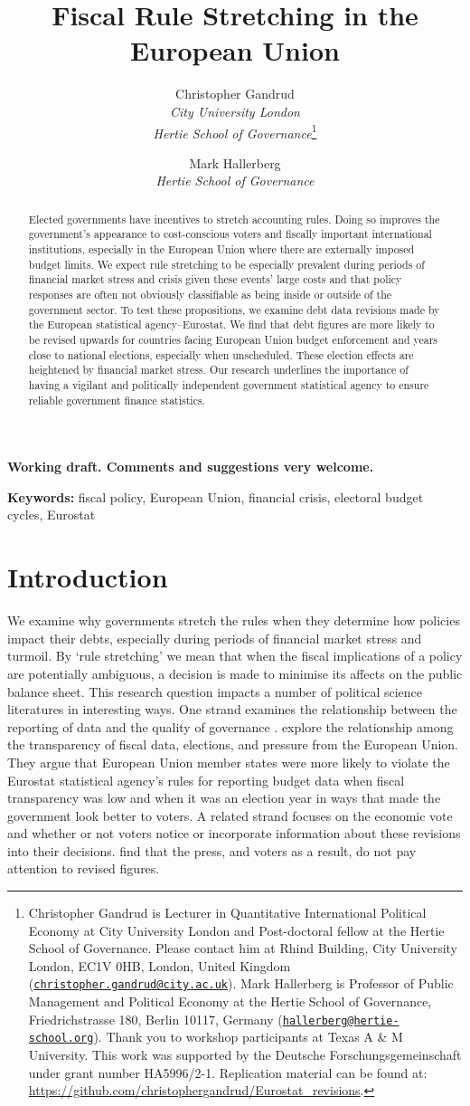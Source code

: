 \documentclass[]{article}
\title{Fiscal Rule Stretching in the European Union}
\author{Christopher Gandrud \\ \emph{City University London} \\ \emph{Hertie School of Governance}\footnote{Christopher Gandrud is Lecturer in Quantitative International Political Economy at City University London and Post-doctoral fellow at the Hertie School of Governance. Please contact him at Rhind Building, City University London, EC1V 0HB, London, United Kingdom
(\href{mailto:christopher.gandrud@city.ac.uk}{\nolinkurl{christopher.gandrud@city.ac.uk}}). Mark Hallerberg is Professor of Public Management and Political Economy at the Hertie School of Governance, Friedrichstrasse 180, Berlin 10117, Germany (\href{mailto:hallerberg@hertie-school.org}{\nolinkurl{hallerberg@hertie-school.org}}). Thank you to workshop participants at Texas A \& M University. This work was supported by the Deutsche Forschungsgemeinschaft under grant number HA5996/2-1. Replication material can be found at: \url{https://github.com/christophergandrud/Eurostat_revisions}.}
\and
Mark Hallerberg \\ \emph{Hertie School of Governance}}
\begin{document}
\maketitle


\begin{center}
    \textbf{Working draft. Comments and suggestions very welcome.}
\end{center}

\begin{abstract}
Elected governments have incentives to stretch accounting rules. Doing so improves the government’s appearance to cost-conscious voters and fiscally important international institutions, especially in the European Union where there are externally imposed budget limits. We expect rule stretching to be especially prevalent during periods of financial market stress and crisis given these events' large costs and that policy responses are often not obviously classifiable as being inside or outside of the government sector. To test these propositions, we examine debt data revisions made by the European statistical agency--Eurostat. We find that debt figures are more likely to be revised upwards for countries facing European Union budget enforcement and years close to national elections, especially when unscheduled. These election effects are heightened by financial market stress. Our research underlines the importance of having a vigilant and politically independent government statistical agency to ensure reliable government finance statistics.
\end{abstract}


\textbf{Keywords:} fiscal policy, European Union, financial crisis, electoral budget cycles, Eurostat


\section{Introduction}

We examine why governments stretch the rules when they determine how policies impact their debts, especially during periods of financial market stress and turmoil. By `rule stretching' we mean that when the fiscal implications of a policy are potentially ambiguous, a decision is made to minimise its affects on the public balance sheet. This research question impacts a number of political science literatures in interesting ways. One strand examines the relationship between the reporting of data and the quality of governance \cite[e.g.][]{Hollyer2014}. \cite{Alt2014} explore the relationship among the transparency of fiscal data, elections, and pressure from the European Union. They argue that European Union member states were more likely to violate the Eurostat statistical agency's rules for reporting budget data when fiscal transparency was low and when it was an election year in ways that made the government look better to voters. A related strand focuses on the economic vote and whether or not voters notice or incorporate information about these revisions into their decisions. \cite{KayserLeininger2015} find that the press, and voters as a result, do not pay attention to revised figures.
\end{document}
